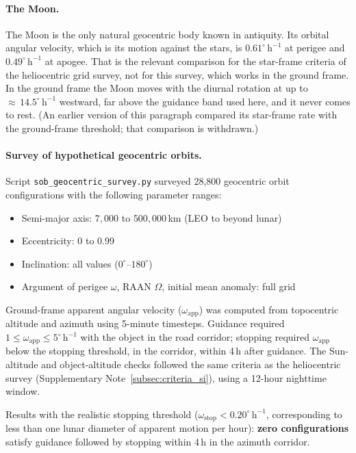 \documentclass[11pt,a4paper]{article}
\begin{document}
\paragraph{The Moon.}
The Moon is the only natural geocentric body known in antiquity.
Its orbital angular velocity, which is its motion against the stars, is
$0.61^\circ\,\mathrm{h}^{-1}$ at perigee and $0.49^\circ\,\mathrm{h}^{-1}$
at apogee. That is the relevant comparison for the star-frame criteria of the
heliocentric grid survey, not for this survey, which works in the ground
frame. In the ground frame the Moon moves with the diurnal rotation at up to
${\approx}\,14.5^\circ\,\mathrm{h}^{-1}$ westward, far above the guidance band
used here, and it never comes to rest. (An earlier version
of this paragraph compared its star-frame rate with the ground-frame threshold;
that comparison is withdrawn.)

\paragraph{Survey of hypothetical geocentric orbits.}
Script \texttt{sob\_geocentric\_survey.py} surveyed 28,800 geocentric orbit
configurations with the following parameter ranges:
\begin{itemize}
  \item Semi-major axis: $7{,}000$ to $500{,}000$\,km (LEO to beyond lunar)
  \item Eccentricity: 0 to 0.99
  \item Inclination: all values ($0^\circ$--$180^\circ$)
  \item Argument of perigee $\omega$, RAAN $\Omega$, initial mean anomaly: full grid
\end{itemize}
Ground-frame apparent angular velocity ($\omega_\mathrm{app}$) was computed
from topocentric altitude and azimuth using 5-minute timesteps. Guidance
required $1\le\omega_\mathrm{app}\le5^\circ\,\mathrm{h}^{-1}$ with the object
in the road corridor; stopping required $\omega_\mathrm{app}$ below the
stopping threshold, in the corridor, within 4\,h after guidance.
The Sun-altitude and object-altitude checks followed the same criteria as the
heliocentric survey (Supplementary Note~\ref{subsec:criteria_si}), using a 12-hour nighttime window.

Results with the realistic stopping threshold ($\omega_\mathrm{stop} <
0.20^\circ\,\mathrm{h}^{-1}$, corresponding to less than one lunar diameter
of apparent motion per hour): \textbf{zero configurations} satisfy guidance
followed by stopping within 4\,h in the azimuth corridor.
\end{document}
